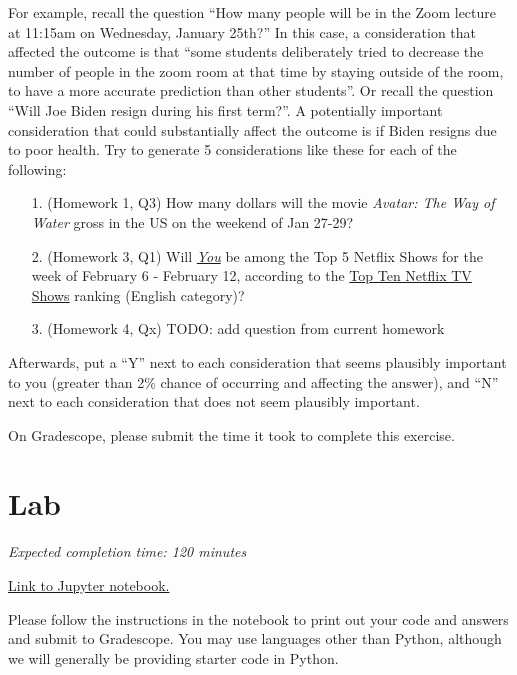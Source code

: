 \documentclass[11pt]{article}
\begin{document}
For example, recall the question ``How many people will be in the Zoom lecture at 11:15am on Wednesday, January 25th?'' In this case, a consideration that affected the outcome is that ``some students deliberately tried to decrease the number of people in the zoom room at that time by staying outside of the room, to have a more accurate prediction than other students''. Or recall the question ``Will Joe Biden resign during his first term?''. A potentially important consideration that could substantially affect the outcome is if Biden resigns due to poor health. Try to generate 5 considerations like these for each of the following:

\begin{enumerate}
	\item[1.] (Homework 1, Q3) How many dollars will the movie \emph{Avatar: The Way of Water} gross in the US on the weekend of Jan 27-29?

	\item[2.] (Homework 3, Q1) Will \href{https://en.wikipedia.org/wiki/You_(TV_series)}{\emph{You}} be among the Top 5 Netflix Shows for the week of February 6 - February 12, according to the \href{https://top10.netflix.com/tv}{Top Ten Netflix TV Shows} ranking (English category)? 

	\item[3.] (Homework 4, Qx) TODO: add question from current homework

\end{enumerate}

Afterwards, put a ``Y'' next to each consideration that seems plausibly important to you (greater than 2\% chance of occurring and affecting the answer), 
and ``N'' next to each consideration that does not seem plausibly important.

On Gradescope, please submit the time it took to complete this exercise.

\section*{Lab}

\emph{Expected completion time: 120 minutes}

\href{http://datahub.berkeley.edu/hub/user-redirect/git-pull?repo=https%3A%2F%2Fgithub.com%2Fjs-d%2Fforecasting-class-sp23&urlpath=tree%2Fforecasting-class-sp23%2Fhw%2Fhw4%2Fhw4lab.ipynb&branch=main}{Link to Jupyter notebook.}

Please follow the instructions in the notebook to print out your code and answers and submit to Gradescope. You may use languages other than Python, although we will generally be providing starter code in Python.
\end{document}
